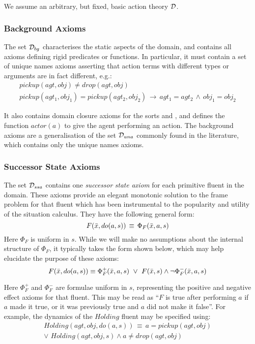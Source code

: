 We assume an arbitrary, but fixed, basic action theory $\mathcal{D}$.


\subsubsection{Background Axioms}

The set $\mathcal{D}_{bg}$ characterises the static aspects of the domain,
and contains all axioms defining rigid predicates or functions. In
particular, it must contain a set of unique names axioms asserting
that action terms with different types or arguments are in fact different,
e.g.:\begin{gather*}
pickup(agt,obj)\neq drop(agt,obj)\\
pickup(agt_{1},obj_{1})=pickup(agt_{2},obj_{2})\,\rightarrow\, agt_{1}=agt_{2}\,\wedge\, obj_{1}=obj_{2}\end{gather*}


It also contains domain closure axioms for the sorts  and , and defines the function $actor(a)$ to
give the agent performing an action. The background axioms are a generalisation
of the set $\mathcal{D}_{una}$ commonly found in the literature, which contains
only the unique names axioms.


\subsubsection{Successor State Axioms}

The set $\mathcal{D}_{ssa}$ contains one \emph{successor state axiom} for
each primitive fluent in the domain. These axioms provide an elegant
monotonic solution to the frame problem for that fluent \citep{reiter91frameprob}
which has been instrumental to the popularity and utility of the situation
calculus. They have the following general form:\[
F(\bar{x},do(a,s))\,\equiv\,\Phi_{F}(\bar{x},a,s)\]
 Here $\Phi_{F}$ is uniform in $s$. While we will make no assumptions
about the internal structure of $\Phi_{F}$, it typically takes the
form shown below, which may help elucidate the purpose of these axioms:
\[
F(\bar{x},do(a,s))\equiv\Phi_{F}^{+}(\bar{x},a,s)\,\,\vee\,\, F(\bar{x},s)\wedge\neg\Phi_{F}^{-}(\bar{x},a,s)\]


Here $\Phi_{F}^{+}$ and $\Phi_{F}^{-}$ are formulae uniform in $s$,
representing the positive and negative effect axioms for that fluent.
This may be read as {}``$F$ is true after performing $a$ if $a$
made it true, or it was previously true and $a$ did not make it false''.
For example, the dynamics of the $Holding$ fluent may be specified
using:\begin{multline*}
Holding(agt,obj,do(a,s))\,\equiv\, a=pickup(agt,obj)\\
\vee\,\, Holding(agt,obj,s)\wedge a\neq drop(agt,obj)\end{multline*}


